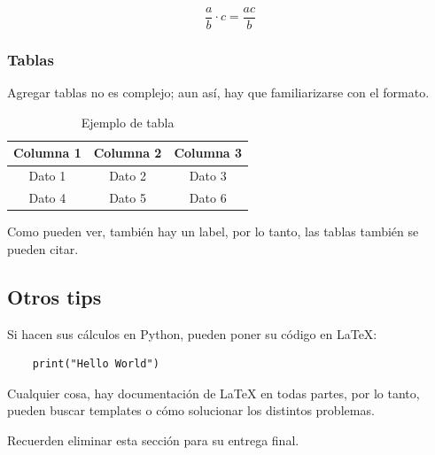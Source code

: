 \documentclass{article} %
\begin{document}
\begin{equation} 
    \frac{a}{b} \cdot c = \frac{ac}{b} 
\end{equation}

\subsubsection{Tablas}

Agregar tablas no es complejo; aun así, hay que familiarizarse con el formato.

\begin{table}[H]
    \centering
    \caption{Ejemplo de tabla}
    \label{tab:ejemplo}
    \begin{tabular}{|c|c|c|}
        \hline
        \textbf{Columna 1} & \textbf{Columna 2} & \textbf{Columna 3} \\
        \hline
        Dato 1 & Dato 2 & Dato 3 \\
        \hline
        Dato 4 & Dato 5 & Dato 6 \\
        \hline
    \end{tabular}
\end{table}

Como pueden ver, también hay un label, por lo tanto, las tablas también se pueden citar.

\subsection{Otros tips}

Si hacen sus cálculos en Python, pueden poner su código en LaTeX:

\begin{lstlisting}
    print("Hello World")
\end{lstlisting}

Cualquier cosa, hay documentación de LaTeX en todas partes, por lo tanto, pueden buscar templates o cómo solucionar los distintos problemas.

Recuerden eliminar esta sección para su entrega final.
\end{document}
